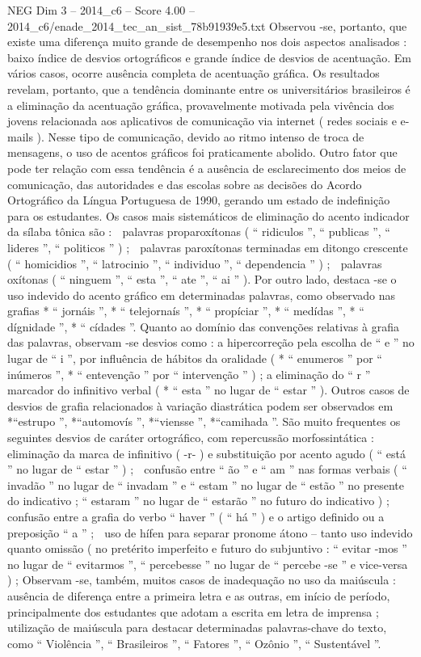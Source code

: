 \begin{textsample}{NEG Dim 3 – 2014\_c6 – Score 4.00 – 2014\_c6/enade\_2014\_tec\_an\_sist\_78b91939e5.txt}
Observou -se, portanto, que existe uma diferença muito grande de desempenho nos dois aspectos analisados : baixo índice de desvios ortográficos e grande índice de desvios de acentuação.
Em vários casos, ocorre ausência completa de acentuação gráfica.
Os resultados revelam, portanto, que a tendência dominante entre os universitários brasileiros é a eliminação da acentuação gráfica, provavelmente motivada pela vivência dos jovens relacionada aos aplicativos de comunicação via internet ( redes sociais e e-mails ).
Nesse tipo de comunicação, devido ao ritmo intenso de troca de mensagens, o uso de acentos gráficos foi praticamente abolido.
Outro fator que pode ter relação com essa tendência é a ausência de esclarecimento dos meios de comunicação, das autoridades e das escolas sobre as decisões do Acordo Ortográfico da Língua Portuguesa de 1990, gerando um estado de indefinição para os estudantes.
Os casos mais sistemáticos de eliminação do acento indicador da sílaba tônica são :  palavras proparoxítonas ( “ ridiculos ”, “ publicas ”, “ lideres ”, “ politicos ” ) ;  palavras paroxítonas terminadas em ditongo crescente ( “ homicidios ”, “ latrocinio ”, “ individuo ”, “ dependencia ” ) ;  palavras oxítonas ( “ ninguem ”, “ esta ”, “ ate ”, “ ai ” ).
Por outro lado, destaca -se o uso indevido do acento gráfico em determinadas palavras, como observado nas grafias * “ jornáis ”, * “ telejornaís ”, * “ propíciar ”, * “ medídas ”, * “ dígnidade ”, * “ cídades ”.
Quanto ao domínio das convenções relativas à grafia das palavras, observam -se desvios como : a hipercorreção pela escolha de “ e ” no lugar de “ i ”, por influência de hábitos da oralidade ( * “ enumeros ” por “ inúmeros ”, * “ entevenção ” por “ intervenção ” ) ; a eliminação do “ r ” marcador do infinitivo verbal ( * “ esta ” no lugar de “ estar ” ).
Outros casos de desvios de grafia relacionados à variação diastrática podem ser observados em *“estrupo ”, *“automovís ”, *“viensse ”, *“camihada ”.
São muito frequentes os seguintes desvios de caráter ortográfico, com repercussão morfossintática :  eliminação da marca de infinitivo ( -r- ) e substituição por acento agudo ( “ está ” no lugar de “ estar ” ) ;  confusão entre “ ão ” e “ am ” nas formas verbais ( “ invadão ” no lugar de “ invadam ” e “ estam ” no lugar de “ estão ” no presente do indicativo ; “ estaram ” no lugar de “ estarão ” no futuro do indicativo ) ;  confusão entre a grafia do verbo “ haver ” ( “ há ” ) e o artigo definido ou a preposição “ a ” ;  uso de hífen para separar pronome átono – tanto uso indevido quanto omissão ( no pretérito imperfeito e futuro do subjuntivo : “ evitar -mos ” no lugar de “ evitarmos ”, “ percebesse ” no lugar de “ percebe -se ” e vice-versa ) ; Observam -se, também, muitos casos de inadequação no uso da maiúscula : ausência de diferença entre a primeira letra e as outras, em início de período, principalmente dos estudantes que adotam a escrita em letra de imprensa ; utilização de maiúscula para destacar determinadas palavras-chave do texto, como “ Violência ”, “ Brasileiros ”, “ Fatores ”, “ Ozônio ”, “ Sustentável ”.

\end{textsample}
